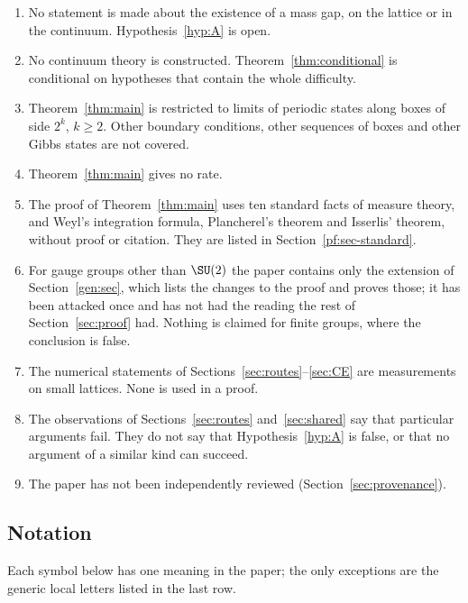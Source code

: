 \begin{enumerate}
\item No statement is made about the existence of a mass gap, on the lattice or in the continuum. Hypothesis~\ref{hyp:A} is open.
\item No continuum theory is constructed. Theorem~\ref{thm:conditional} is conditional on hypotheses that contain the whole difficulty.
\item Theorem~\ref{thm:main} is restricted to limits of periodic states along boxes of side $2^k$, $k\ge2$. Other boundary conditions, other sequences of boxes and other Gibbs states are not covered.
\item Theorem~\ref{thm:main} gives no rate.
\item The proof of Theorem~\ref{thm:main} uses ten standard facts of measure theory, and Weyl's integration formula, Plancherel's theorem and Isserlis' theorem, without proof or citation. They are listed in Section~\ref{pf:sec-standard}.
\item For gauge groups other than $\SU(2)$ the paper contains only the extension of Section~\ref{gen:sec}, which lists the changes to the proof and proves those; it has been attacked once and has not had the reading the rest of Section~\ref{sec:proof} had. Nothing is claimed for finite groups, where the conclusion is false.
\item The numerical statements of Sections~\ref{sec:routes}--\ref{sec:CE} are measurements on small lattices. None is used in a proof.
\item The observations of Sections~\ref{sec:routes} and~\ref{sec:shared} say that particular arguments fail. They do not say that Hypothesis~\ref{hyp:A} is false, or that no argument of a similar kind can succeed.
\item The paper has not been independently reviewed (Section~\ref{sec:provenance}).
\end{enumerate}

\subsection*{Notation}
Each symbol below has one meaning in the paper; the only exceptions are the generic local letters listed in the last row.

